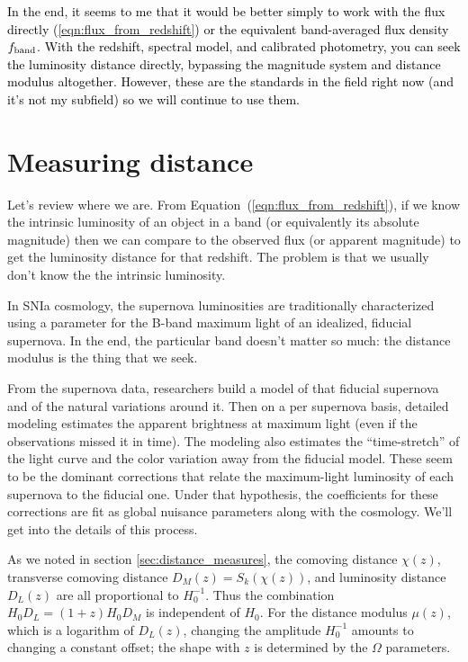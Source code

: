 \textcolor{black}{In the end, it seems to me that it would be better simply to work with the flux directly (\ref{eqn:flux_from_redshift}) or the equivalent band-averaged flux density $f_{\rm band}$. With the redshift, spectral model, and calibrated photometry, you can seek the luminosity distance directly, bypassing the magnitude system and distance modulus altogether.  However, these are the standards in the field right now (and it's not my subfield) so we will continue to use them.}

\section{Measuring distance} \label{sec:measuring_distance}
Let's review where we are.  From Equation~(\ref{eqn:flux_from_redshift}), if we know the intrinsic luminosity of an object in a band (or equivalently its absolute magnitude) then we can compare to the observed flux (or apparent magnitude) to get the luminosity distance for that redshift.  The problem is that we usually don't know the the intrinsic luminosity.

In SNIa cosmology,  the supernova luminosities are traditionally characterized using a parameter for the B-band maximum light of an idealized, fiducial supernova.  In the end, the particular band doesn't matter so much: the distance modulus is the thing that we seek.

From the supernova data, researchers build a model of that fiducial supernova and of the natural variations around it.  Then on a per supernova basis, detailed modeling estimates the apparent brightness at maximum light (even if the observations missed it in time). The modeling also estimates the ``time-stretch'' of the light curve and the color variation away from the fiducial model.  These seem to be the dominant corrections that relate the maximum-light luminosity of each supernova to the fiducial one.  Under that hypothesis, the coefficients for these corrections are fit as global nuisance parameters along with the cosmology.  We'll get into the details of this process.

As we noted in section \ref{sec:distance_measures}, the comoving distance $\chi(z)$, transverse comoving distance $D_M(z) = S_k(\chi(z))$, and luminosity distance $D_L(z)$ are all proportional to $H_0^{-1}$.  Thus the combination $H_0 D_L =  (1+z)H_0 D_M$ is independent of $H_0$.  For the distance modulus $\mu(z)$, which is a logarithm of $D_L(z)$, changing the amplitude $H_0^{-1}$ amounts to changing a constant offset; the shape with $z$ is determined by the $\Omega$ parameters.  

